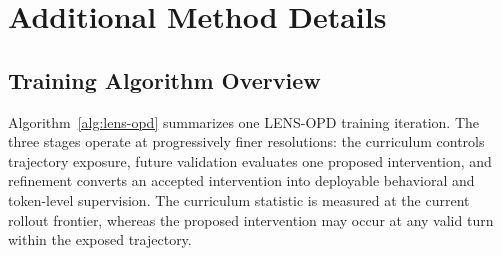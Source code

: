 \documentclass{article}
\begin{document}
\clearpage
\appendix

\section{Additional Method Details}
\label{app:method_details}
\subsection{Training Algorithm Overview}

Algorithm~\ref{alg:lens-opd} summarizes one LENS-OPD training iteration.  The three stages operate
at progressively finer resolutions: the curriculum controls trajectory exposure, future validation
evaluates one proposed intervention, and refinement converts an accepted intervention into deployable
behavioral and token-level supervision.  The curriculum statistic is measured at the current rollout
frontier, whereas the proposed intervention may occur at any valid turn within the exposed trajectory.
\end{document}
